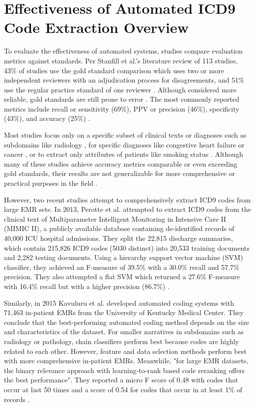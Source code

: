 \documentclass[sigconf]{acmart}
\begin{document}
\section{Effectiveness of Automated ICD9 Code Extraction Overview}
To evaluate the effectiveness of automated systems, studies compare evaluation metrics against standards. Per Stanfill et al.'s literature review of 113 studies, 43\% of studies use the gold standard comparison which uses two or more independent reviewers with an adjudication process for disagreements, and 51\% use the regular practice standard of one reviewer \cite{stanfill2010systematic}. Although considered more reliable, gold standards are still prone to error \cite{perotte2013diagnosis}. The most commonly reported metrics include recall or sensitivity (69\%), PPV or precision (46\%), specificity (43\%), and accuracy (25\%) \cite{stanfill2010systematic}.

Most studies focus only on a specific subset of clinical texts or diagnoses such as subdomains like radiology \cite{pons2016natural}, for specific diagnoses like congestive heart failure \cite{friedlin2006natural} or cancer \cite{mamlin2003automated}, or to extract only attributes of patients like smoking status \cite{uzuner2008identifying}. Although many of these studies achieve accuracy metrics comparable or even exceeding gold standards, their results are not generalizable for more comprehensive or practical purposes in the field \cite{stanfill2010systematic}.

However, two recent studies attempt to comprehensively extract ICD9 codes from large EMR sets. In 2013, Perotte et al. attempted to extract ICD9 codes from the clinical text of Multiparameter Intelligent Monitoring in Intensive Care II (MIMIC II), a publicly available database containing de-identified records of 40,000 ICU hospital admissions. They split the 22,815 discharge summaries, which contain 215,826 ICD9 codes (5030 distinct) into 20,533 training documents and 2,282 testing documents. Using a hierarchy support vector machine (SVM) classifier, they achieved an F-measure of 39.5\% with a 30.0\% recall and 57.7\% precision. They also attempted a flat SVM which returned a 27.6\% F-measure with 16.4\% recall but with a higher precision (86.7\%) \cite{perotte2013diagnosis}.

Similarly, in 2015 Kavuluru et al. developed automated coding systems with 71,463 in-patient EMRs from the University of Kentucky Medical Center. They conclude that the best-performing automated coding method depends on the size and characteristics of the dataset. For smaller narratives in subdomains such as radiology or pathology, chain classifiers perform best because codes are highly related to each other. However, feature and data selection methods perform best with more comprehensive in-patient EMRs. Meanwhile, "for large EMR datasets, the binary relevance approach with learning-to-rank based code reranking offers the best performance". They reported a micro F score of 0.48 with codes that occur at last 50 times and a score of 0.54 for codes that occur in at least 1\% of records \cite{kavuluru2015empirical}.
\end{document}

